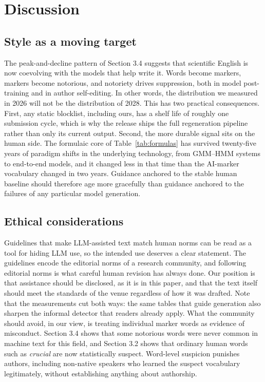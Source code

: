 \documentclass[a4paper,10pt,twocolumn]{article}
\begin{document}
\section{Discussion}

\subsection{Style as a moving target}

The peak-and-decline pattern of Section 3.4 suggests that scientific English is now coevolving with the models that help write it. Words become markers, markers become notorious, and notoriety drives suppression, both in model post-training and in author self-editing. In other words, the distribution we measured in 2026 will not be the distribution of 2028. This has two practical consequences. First, any static blocklist, including ours, has a shelf life of roughly one submission cycle, which is why the release ships the full regeneration pipeline rather than only its current output. Second, the more durable signal sits on the human side. The formulaic core of Table~\ref{tab:formulas} has survived twenty-five years of paradigm shifts in the underlying technology, from GMM--HMM systems to end-to-end models, and it changed less in that time than the AI-marker vocabulary changed in two years. Guidance anchored to the stable human baseline should therefore age more gracefully than guidance anchored to the failures of any particular model generation.

\subsection{Ethical considerations}

Guidelines that make LLM-assisted text match human norms can be read as a tool for hiding LLM use, so the intended use deserves a clear statement. The guidelines encode the editorial norms of a research community, and following editorial norms is what careful human revision has always done. Our position is that assistance should be disclosed, as it is in this paper, and that the text itself should meet the standards of the venue regardless of how it was drafted. Note that the measurements cut both ways: the same tables that guide generation also sharpen the informal detector that readers already apply. What the community should avoid, in our view, is treating individual marker words as evidence of misconduct. Section 3.4 shows that some notorious words were never common in machine text for this field, and Section 3.2 shows that ordinary human words such as \emph{crucial} are now statistically suspect. Word-level suspicion punishes authors, including non-native speakers who learned the suspect vocabulary legitimately, without establishing anything about authorship.
\end{document}

